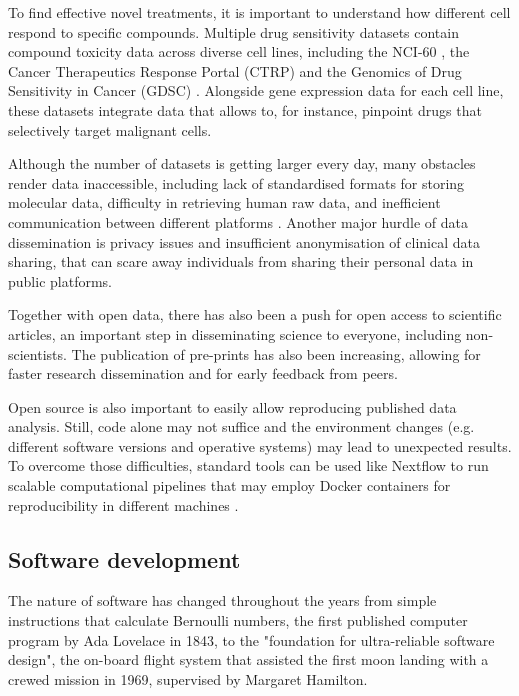 To find effective novel treatments, it is important to understand how different cell respond to specific compounds. Multiple drug sensitivity datasets contain compound toxicity data across diverse cell lines, including the NCI-60 \cite{shoemaker:2006wi}, the Cancer Therapeutics Response Portal (CTRP) \cite{seashore-ludlow:2015ws} and the Genomics of Drug Sensitivity in Cancer (GDSC) \cite{yang:2012vk}. Alongside gene expression data for each cell line, these datasets integrate data that allows to, for instance, pinpoint drugs that selectively target malignant cells.

Although the number of datasets is getting larger every day, many obstacles render data inaccessible, including lack of standardised formats for storing molecular data, difficulty in retrieving human raw data, and inefficient communication between different platforms \cite{rockhold:2019ws}. Another major hurdle of data dissemination is privacy issues and insufficient anonymisation of clinical data sharing, that can scare away individuals from sharing their personal data in public platforms.

Together with open data, there has also been a push for open access to scientific articles, an important step in disseminating science to everyone, including non-scientists. The publication of pre-prints has also been increasing, allowing for faster research dissemination and for early feedback from peers.

Open source is also important to easily allow reproducing published data analysis. Still, code alone may not suffice and the environment changes (e.g. different software versions and operative systems) may lead to unexpected results. To overcome those difficulties, standard tools can be used like Nextflow to run scalable computational pipelines that may employ Docker containers for reproducibility in different machines \cite{di-tommaso:2017vq}.

\subsection{Software development}

The nature of software has changed throughout the years from simple instructions that calculate Bernoulli numbers, the first published computer program by Ada Lovelace in 1843, to the "foundation for ultra-reliable software design", the on-board flight system that assisted the first moon landing with a crewed mission in 1969, supervised by Margaret Hamilton.

